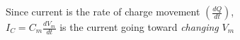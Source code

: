\documentclass[preview]{standalone}
\begin{document}
\begin{center}
Since current is the rate of charge movement $\left(\frac{dQ}{dt}\right)$,\\$I_C = C_m\frac{dV_m}{dt}$ is the current going toward \emph{changing} $V_m$
\end{center}
\end{document}
